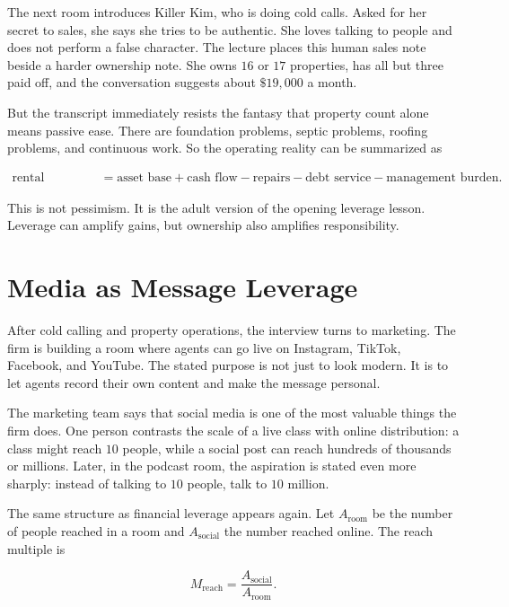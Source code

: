 The next room introduces Killer Kim, who is doing cold calls. Asked for her secret to sales, she says she tries to be authentic. She loves talking to people and does not perform a false character. The lecture places this human sales note beside a harder ownership note. She owns \(16\) or \(17\) properties, has all but three paid off, and the conversation suggests about \(\$19{,}000\) a month.

But the transcript immediately resists the fantasy that property count alone means passive ease. There are foundation problems, septic problems, roofing problems, and continuous work. So the operating reality can be summarized as

\begin{align}
\text{rental ownership}
&=
\text{asset base}
+
\text{cash flow}
-
\text{repairs}
-
\text{debt service}
-
\text{management burden}.
\end{align}

This is not pessimism. It is the adult version of the opening leverage lesson. Leverage can amplify gains, but ownership also amplifies responsibility.

\section{Media as Message Leverage}

After cold calling and property operations, the interview turns to marketing. The firm is building a room where agents can go live on Instagram, TikTok, Facebook, and YouTube. The stated purpose is not just to look modern. It is to let agents record their own content and make the message personal.

The marketing team says that social media is one of the most valuable things the firm does. One person contrasts the scale of a live class with online distribution: a class might reach \(10\) people, while a social post can reach hundreds of thousands or millions. Later, in the podcast room, the aspiration is stated even more sharply: instead of talking to \(10\) people, talk to \(10\) million.

The same structure as financial leverage appears again. Let \(A_{\mathrm{room}}\) be the number of people reached in a room and \(A_{\mathrm{social}}\) the number reached online. The reach multiple is

\begin{equation}
M_{\mathrm{reach}}
=
\frac{A_{\mathrm{social}}}{A_{\mathrm{room}}}.
\end{equation}

